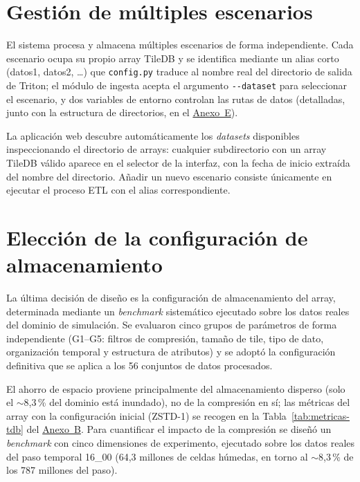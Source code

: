 \FloatBarrier
\section{Gestión de múltiples escenarios}\label{gestion-de-multiples-escenarios-argumento---dataset}

El sistema procesa y almacena múltiples escenarios de forma independiente. Cada escenario ocupa su propio array TileDB y se identifica mediante un alias corto (datos1, datos2, \ldots) que \texttt{config.py} traduce al nombre real del directorio de salida de Triton; el módulo de ingesta acepta el argumento \texttt{-\/-dataset} para seleccionar el escenario, y dos variables de entorno controlan las rutas de datos (detalladas, junto con la estructura de directorios, en el \hyperref[anexo-e.-guia-de-despliegue]{Anexo~E}).

La aplicación web descubre automáticamente los \textit{datasets} disponibles inspeccionando el directorio de arrays: cualquier subdirectorio con un array TileDB válido aparece en el selector de la interfaz, con la fecha de inicio extraída del nombre del directorio. Añadir un nuevo escenario consiste únicamente en ejecutar el proceso ETL con el alias correspondiente.

\section{Elección de la configuración de almacenamiento}\label{benchmark-de-almacenamiento}

La última decisión de diseño es la configuración de almacenamiento del array, determinada mediante un \textit{benchmark} sistemático ejecutado sobre los datos reales del dominio de simulación. Se evaluaron cinco grupos de parámetros de forma independiente (G1--G5: filtros de compresión, tamaño de tile, tipo de dato, organización temporal y estructura de atributos) y se adoptó la configuración definitiva que se aplica a los 56 conjuntos de datos procesados.

El ahorro de espacio proviene principalmente del almacenamiento disperso (solo el $\sim$8,3\,\% del dominio está inundado), no de la compresión en sí; las métricas del array con la configuración inicial (ZSTD-1) se recogen en la Tabla~\ref{tab:metricas-tdb} del \hyperref[anexo-b.-tablas-de-resultados-completas]{Anexo~B}. Para cuantificar el impacto de la compresión se diseñó un \textit{benchmark} con cinco dimensiones de experimento, ejecutado sobre los datos reales del paso temporal 16\_00 (64,3 millones de celdas húmedas, en torno al $\sim$8,3\,\% de los 787 millones del paso).

